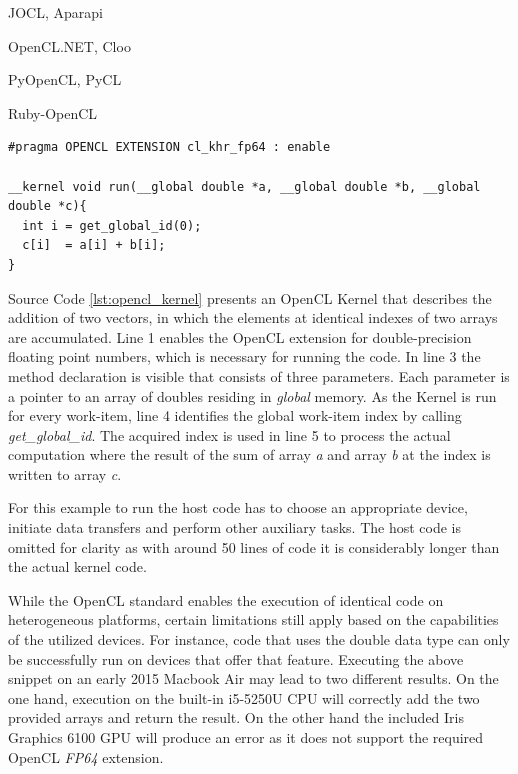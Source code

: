 \begin{description}[align=left,labelwidth=1.5cm]
  \item [Java] JOCL, Aparapi
  \item [.NET] OpenCL.NET, Cloo
  \item [Python] PyOpenCL, PyCL
  \item [Ruby] Ruby-OpenCL
\end{description}

\begin{minipage}{\linewidth}

\begin{lstlisting}[caption=OpenCL Vector Addition Kernel,captionpos=b,label={lst:opencl_kernel}]
#pragma OPENCL EXTENSION cl_khr_fp64 : enable

__kernel void run(__global double *a, __global double *b, __global double *c){
  int i = get_global_id(0);
  c[i]  = a[i] + b[i];
}
\end{lstlisting}
\end{minipage}
Source Code \ref{lst:opencl_kernel} presents an OpenCL Kernel that describes the addition of two vectors, in which the elements at identical indexes of two arrays are accumulated. Line 1 enables the OpenCL extension for double-precision floating point numbers, which is necessary for running the code. In line 3 the method declaration is visible that consists of three parameters. Each parameter is a pointer to an array of doubles residing in \textit{global} memory. As the Kernel is run for every work-item, line 4 identifies the global work-item index by calling \textit{get\_global\_id}. The acquired index is used in line 5 to process the actual computation where the result of the sum of array \textit{a} and array \textit{b} at the index is written to array \textit{c}.

For this example to run the host code has to choose an appropriate device, initiate data transfers and perform other auxiliary tasks. The host code is omitted for clarity as with around 50 lines of code it is considerably longer than the actual kernel code. 

While the OpenCL standard enables the execution of identical code on heterogeneous platforms, certain limitations still apply based on the capabilities of the utilized devices. For instance, code that uses the double data type can only be successfully run on devices that offer that feature. Executing the above snippet on an early 2015 Macbook Air may lead to two different results. On the one hand, execution on the built-in i5-5250U CPU will correctly add the two provided arrays and return the result. On the other hand the included Iris Graphics 6100 GPU will produce an error as it does not support the required OpenCL \textit{FP64} extension.

